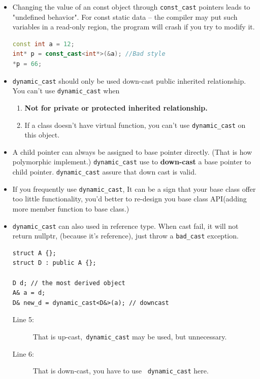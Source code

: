 \documentclass[a4paper,11pt,twoside]{book}
\begin{document}
\begin{itemize}
	\item Changing the value of an const object through \texttt{const\_cast} pointers leads to  "undefined behavior". For const static data -- the compiler may put such variables in a read-only region, the program will crash if you try to modify it.
	
\begin{lstlisting}[frame=single, language=c++]
const int a = 12;
int* p = const_cast<int*>(&a); //Bad style
*p = 66;
\end{lstlisting}
	

	
	\item \texttt{dynamic\_cast} should only be used down-cast public inherited relationship. You can't use \texttt{dynamic\_cast} when
	\begin{enumerate}
		\item \textbf{Not for private or protected inherited relationship.}
		\item If a class doesn't have virtual function, you can't use \texttt{dynamic\_cast} on this object.
	\end{enumerate}
	
	\item A child pointer can always be assigned to base pointer directly. (That is how polymorphic implement.) \texttt{dynamic\_cast} use to \textbf{down-cast} a base pointer to child pointer. \texttt{dynamic\_cast} assure that down cast is valid. 
	
	\item If you frequently use \texttt{dynamic\_cast}, It can be a sign that your base class offer too little functionality, you'd better to re-design you base class API(adding more member function to base class.)
	
	\item \texttt{dynamic\_cast} can also used in reference type. When cast fail, it will not return nullptr, (because it's reference), just throw a \texttt{bad\_cast} exception.
	
\begin{lstlisting}
struct A {};
struct D : public A {};

D d; // the most derived object
A& a = d;
D& new_d = dynamic_cast<D&>(a); // downcast
\end{lstlisting}
\begin{description}
	\item[Line 5:] That is up-cast,\texttt{ dynamic\_cast} may be used, but unnecessary.
	\item[Line 6:] That is down-cast, you have to use \texttt{ dynamic\_cast} here. 
\end{description}
	

\end{itemize}
\end{document}
